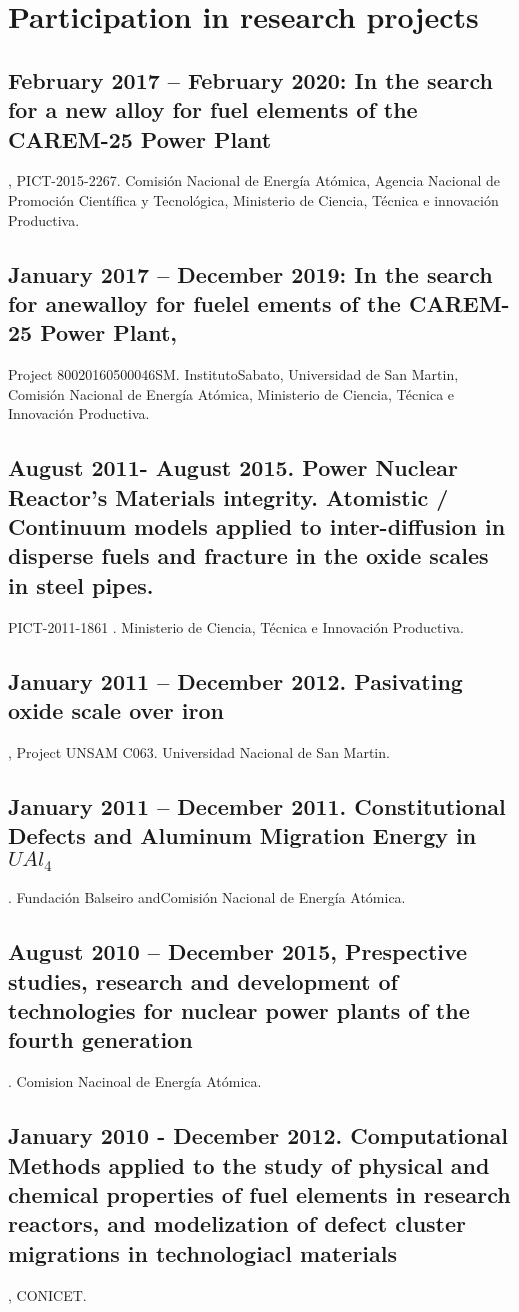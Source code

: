 \section{Participation in research projects}

\subsection{February 2017 – February 2020: In the search for a new alloy for fuel elements of the CAREM-25 Power Plant}, PICT-2015-2267. Comisión Nacional de Energía Atómica, Agencia Nacional de Promoción Científica y Tecnológica, Ministerio de Ciencia, Técnica e innovación Productiva.

\subsection{January 2017 – December 2019: In the search for anewalloy for fuelel ements of the CAREM-25 Power Plant, }Project 80020160500046SM. InstitutoSabato, Universidad de San Martin, Comisión Nacional de Energía Atómica, Ministerio de Ciencia, Técnica e Innovación Productiva.

\subsection{August 2011- August 2015. Power Nuclear Reactor’s Materials integrity. Atomistic / Continuum models applied to inter-diffusion in disperse fuels and fracture in the oxide scales in steel pipes.} PICT-2011-1861 . Ministerio de Ciencia, Técnica e Innovación Productiva. 

\subsection{January 2011 – December 2012. Pasivating oxide scale over iron}, Project UNSAM C063. Universidad Nacional de San Martin. 

 \subsection{January 2011 – December 2011. Constitutional Defects and Aluminum Migration Energy in $UAl_4$}. Fundación Balseiro andComisión Nacional de Energía Atómica. 

\subsection{August 2010 – December 2015, Prespective studies, research and development of technologies for nuclear power plants of the fourth generation}. Comision Nacinoal de Energía Atómica.

 \subsection{January 2010 - December 2012. Computational Methods applied to the study of physical and chemical properties of fuel elements in research reactors, and modelization of defect cluster migrations in technologiacl materials}, CONICET.

